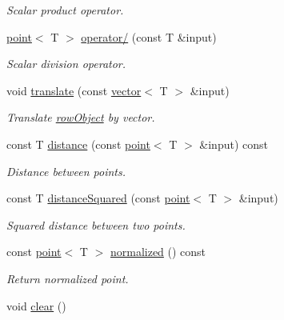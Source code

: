 \begin{DoxyCompactItemize}
\begin{DoxyCompactList}\small\item\em Scalar product operator. \end{DoxyCompactList}\item 
\hyperlink{classddd_1_1point}{point}$<$ T $>$ \hyperlink{classddd_1_1point_a9f347ae983daa189f3d7a127dbacc057}{operator/} (const T \&input)
\begin{DoxyCompactList}\small\item\em Scalar division operator. \end{DoxyCompactList}\item 
void \hyperlink{classddd_1_1point_a36c06fef72376a058c663dd9632ddcd0}{translate} (const \hyperlink{classddd_1_1vector}{vector}$<$ T $>$ \&input)
\begin{DoxyCompactList}\small\item\em Translate \hyperlink{classddd_1_1row_object}{row\+Object} by vector. \end{DoxyCompactList}\item 
const T \hyperlink{classddd_1_1point_a59d8714cc178090ddf75b0c9dbd832c9}{distance} (const \hyperlink{classddd_1_1point}{point}$<$ T $>$ \&input) const
\begin{DoxyCompactList}\small\item\em Distance between points. \end{DoxyCompactList}\item 
const T \hyperlink{classddd_1_1point_a4b6793fd154fc9ad4dd93a4927d4ee13}{distance\+Squared} (const \hyperlink{classddd_1_1point}{point}$<$ T $>$ \&input)
\begin{DoxyCompactList}\small\item\em Squared distance between two points. \end{DoxyCompactList}\item 
\mbox{\label{classddd_1_1point_ac17331c629f79d5abd4b48d807967470}} 
const \hyperlink{classddd_1_1point}{point}$<$ T $>$ \hyperlink{classddd_1_1point_ac17331c629f79d5abd4b48d807967470}{normalized} () const
\begin{DoxyCompactList}\small\item\em Return normalized point. \end{DoxyCompactList}\item 
\mbox{\label{classddd_1_1row_object_a1da634f01207c96a25d5d53a74619afe}} 
void \hyperlink{classddd_1_1row_object_a1da634f01207c96a25d5d53a74619afe}{clear} ()

\end{DoxyCompactItemize}
